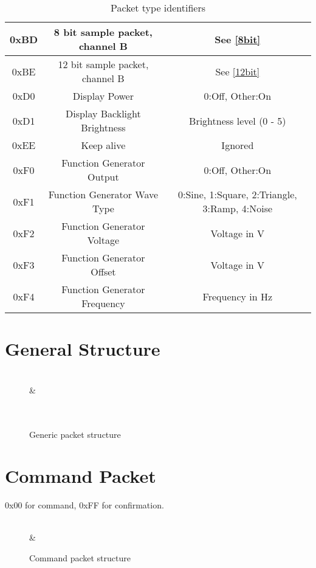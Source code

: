 \documentclass[]{article}
\begin{document}
\begin{table}[H]
\begin{tabular}{|>{\ttfamily}c|c|c|}
		0xBD & 8 bit sample packet, channel B & See \autoref{8bit} \\ \hline
		0xBE & 12 bit sample packet, channel B & See \autoref{12bit} \\ \hline
		0xD0 & Display Power & 0:Off, Other:On \\ \hline
		0xD1 & Display Backlight Brightness & Brightness level (0 - 5) \\ \hline
		0xEE & Keep alive & Ignored \\ \hline
		0xF0 & Function Generator Output & 0:Off, Other:On \\ \hline
		0xF1 & Function Generator Wave Type & 0:Sine, 1:Square, 2:Triangle, 3:Ramp, 4:Noise \\ \hline
		0xF2 & Function Generator Voltage & Voltage in \textmu V \\ \hline
		0xF3 & Function Generator Offset & Voltage in \textmu V \\ \hline
		0xF4 & Function Generator Frequency & Frequency in Hz \\ \hline
	\end{tabular}
	\caption{Packet type identifiers}
\end{table}

\section{General Structure}
\begin{figure}[H]
	\centering
	\begin{bytefield}[bitwidth=2em]{16}
		 \\
		 &  \\
		 \\
		 \\
	\end{bytefield}
	\caption{Generic packet structure}
\end{figure}

\section{Command Packet}

0x00 for command, 0xFF for confirmation.

\begin{figure}[H]
	\centering
	\begin{bytefield}[bitwidth=2em]{16}
		 \\
		 &  \\
	\end{bytefield}
	\caption{Command packet structure}
\end{figure}
\end{document}
